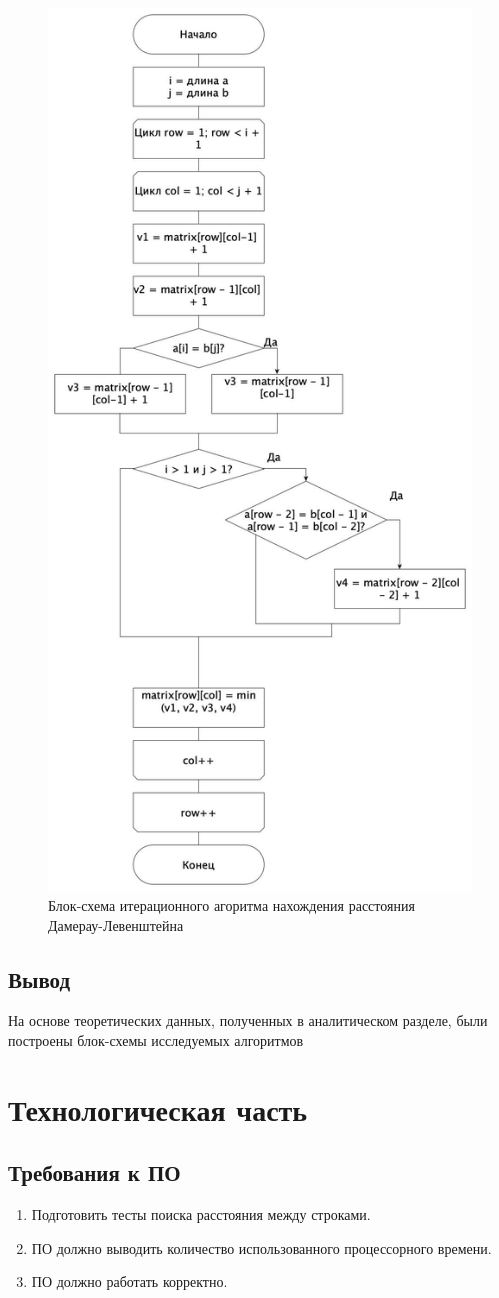 \documentclass[12pt]{report}
\begin{document}
    \begin{figure}[H]
        \centering
        \includegraphics[width=0.6\linewidth]{img/levDamCasual}
        \caption{Блок-схема итерационного агоритма нахождения расстояния Дамерау-Левенштейна}
        \label{fig:levDamCasual}
    \end{figure}


    \section{Вывод}
    На основе теоретических данных, полученных в аналитическом разделе,
    были построены блок-схемы исследуемых алгоритмов


    \chapter{Технологическая часть}


    \section{Требования к ПО}
    \begin{enumerate}
        \item Подготовить тесты поиска расстояния между строками.
        \item ПО должно выводить количество использованного процессорного времени.
        \item ПО должно работать корректно.
    \end{enumerate}
\end{document}
